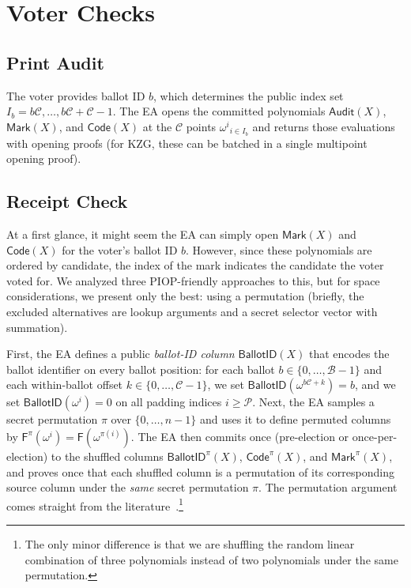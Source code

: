 

\section{Voter Checks}
\label{app:vv}

\subsection{Print Audit}
\label{sec:print}

The voter provides ballot ID $b$, which determines the public index set $I_b={b\mathcal{C},\ldots,b\mathcal{C}+\mathcal{C}-1}$. The EA opens the committed polynomials $\mathsf{Audit}(X)$, $\mathsf{Mark}(X)$, and $\mathsf{Code}(X)$ at the $\mathcal{C}$ points ${\omega^i}_{i\in I_b}$ and returns those evaluations with opening proofs (for KZG, these can be batched in a single multipoint opening proof). 

\subsection{Receipt Check}
\label{sec:receipt}

At a first glance, it might seem the EA can simply open $\mathsf{Mark}(X)$ and $\mathsf{Code}(X)$ for the voter's ballot ID $b$. However, since these polynomials are ordered by candidate, the index of the mark indicates the candidate the voter voted for. We analyzed three PIOP-friendly approaches to this, but for space considerations, we present only the best: using a permutation (briefly, the excluded alternatives are lookup arguments and a secret selector vector with summation). 

First, the EA defines a public \emph{ballot-ID column} $\mathsf{BallotID}(X)$ that encodes the ballot identifier on every ballot position: for each ballot $b\in\{0,\dots,\mathcal{B}-1\}$ and each within-ballot offset $k\in\{0,\dots,\mathcal{C}-1\}$, we set $\mathsf{BallotID}(\omega^{b\mathcal{C}+k})=b$, and we set $\mathsf{BallotID}(\omega^i)=0$ on all padding indices $i\ge \mathcal{P}$. Next, the EA samples a secret permutation $\pi$ over $\{0,\dots,n-1\}$ and uses it to define permuted columns by $\mathsf{F}^{\pi}(\omega^i)=\mathsf{F}(\omega^{\pi(i)})$. The EA then commits once (pre-election or once-per-election) to the shuffled columns $\mathsf{BallotID}^{\pi}(X)$, $\mathsf{Code}^{\pi}(X)$, and $\mathsf{Mark}^{\pi}(X)$, and proves once that each shuffled column is a permutation of its corresponding source column under the \emph{same} secret permutation $\pi$. The permutation argument comes straight from the literature~\cite{GWC19}.\footnote{The only minor difference is that we are shuffling the random linear combination of three polynomials instead of two polynomials under the same permutation.}

